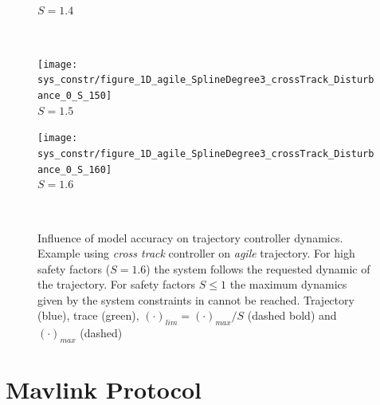 \begin{figure}[H]
\begin{minipage}[t]{0.48\textwidth}
  \\ $S=1.4$
  \end{minipage}\\ \hspace{5pt}
  \begin{minipage}[t]{0.48\textwidth}
    \centering
    \texttt{[image: sys\_constr/figure\_1D\_agile\_SplineDegree3\_crossTrack\_Disturbance\_0\_S\_150]}
  \\ $S=1.5$
  \end{minipage}
  \begin{minipage}[t]{0.48\textwidth}
    \centering
    \texttt{[image: sys\_constr/figure\_1D\_agile\_SplineDegree3\_crossTrack\_Disturbance\_0\_S\_160]}
  \\ $S=1.6$
  \end{minipage} \\
  \label{fig:app_sys_constr}
  \caption{Influence of model accuracy on trajectory controller dynamics. Example using \textit{cross track} controller on \textit{agile} trajectory. For high safety factors ($S=1.6$) the system follows the requested dynamic of the trajectory. For safety factors $S\leq 1$ the maximum dynamics given by the system constraints in \cite{weichart} cannot be reached. Trajectory (blue), trace (green), $(\cdot)_{lim}=(\cdot)_{max}/S$ (dashed bold) and $(\cdot)_{max}$ (dashed)}
\end{figure}


\chapter{Mavlink Protocol}
\label{cha:app_mavlink_protocol}

